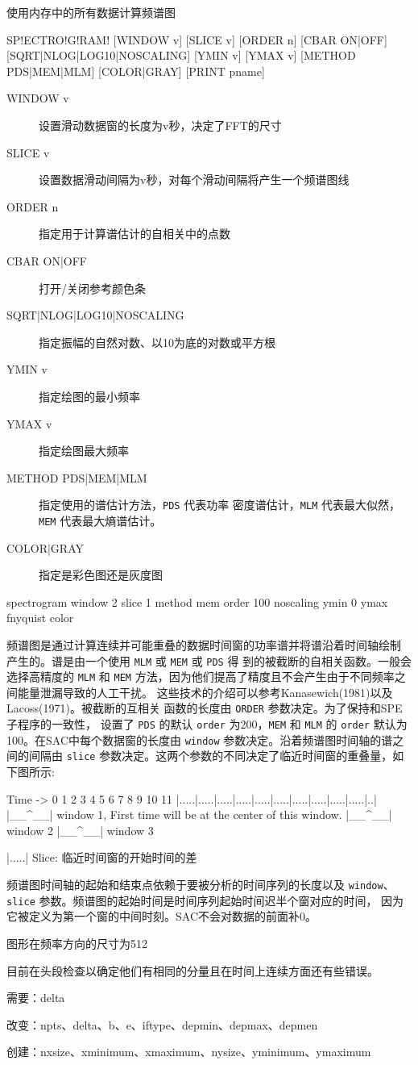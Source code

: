 \label{cmd:spectrogram}

使用内存中的所有数据计算频谱图

\begin{SACSTX}
SP!ECTRO!G!RAM! [WINDOW v] [SLICE v] [ORDER n] [CBAR ON|OFF]
    [SQRT|NLOG|LOG10|NOSCALING]
    [YMIN v] [YMAX v] [METHOD PDS|MEM|MLM] [COLOR|GRAY]
    [PRINT pname]
\end{SACSTX}

\begin{description}
\item [WINDOW v] 设置滑动数据窗的长度为v秒，决定了FFT的尺寸
\item [SLICE v] 设置数据滑动间隔为v秒，对每个滑动间隔将产生一个频谱图线
\item [ORDER n] 指定用于计算谱估计的自相关中的点数
\item [CBAR ON|OFF] 打开/关闭参考颜色条
\item [SQRT|NLOG|LOG10|NOSCALING] 指定振幅的自然对数、以10为底的对数或平方根
\item [YMIN v] 指定绘图的最小频率
\item [YMAX v] 指定绘图最大频率
\item [METHOD PDS|MEM|MLM] 指定使用的谱估计方法，\texttt{PDS} 代表功率
    密度谱估计，\texttt{MLM} 代表最大似然，\texttt{MEM} 代表最大熵谱估计。
\item [COLOR|GRAY] 指定是彩色图还是灰度图
\end{description}

\begin{SACDFT}
spectrogram window 2 slice 1 method mem order 100 noscaling
    ymin 0 ymax fnyquist color
\end{SACDFT}

频谱图是通过计算连续并可能重叠的数据时间窗的功率谱并将谱沿着时间轴绘制
产生的。谱是由一个使用 \texttt{MLM} 或 \texttt{MEM} 或 \texttt{PDS} 得
到的被截断的自相关函数。一般会选择高精度的 \texttt{MLM} 和 \texttt{MEM}
方法，因为他们提高了精度且不会产生由于不同频率之间能量泄漏导致的人工干扰。
这些技术的介绍可以参考Kanasewich(1981)以及Lacoss(1971)。被截断的互相关
函数的长度由 \texttt{ORDER} 参数决定。为了保持和SPE子程序的一致性，
设置了 \texttt{PDS} 的默认 \texttt{order} 为200，\texttt{MEM} 和
\texttt{MLM} 的 \texttt{order} 默认为100。在SAC中每个数据窗的长度由
\texttt{window} 参数决定。沿着频谱图时间轴的谱之间的间隔由 \texttt{slice}
参数决定。这两个参数的不同决定了临近时间窗的重叠量，如下图所示:
\begin{SACCode}
Time ->
0  1  2  3  4  5  6  7  8  9 10 11
|.....|.....|.....|.....|.....|.....|.....|.....|.....|.....|..|
|__^__| window 1, First time will be at the center of this window.
      |__^__| window 2
            |__^__| window 3

|.....| Slice: 临近时间窗的开始时间的差
\end{SACCode}
频谱图时间轴的起始和结束点依赖于要被分析的时间序列的长度以及 \texttt{window}、
\texttt{slice} 参数。频谱图的起始时间是时间序列起始时间迟半个窗对应的时间，
因为它被定义为第一个窗的中间时刻。SAC不会对数据的前面补0。

图形在频率方向的尺寸为512

目前在头段检查以确定他们有相同的分量且在时间上连续方面还有些错误。

需要：delta

改变：npts、delta、b、e、iftype、depmin、depmax、depmen

创建：nxsize、xminimum、xmaximum、nysize、yminimum、ymaximum
